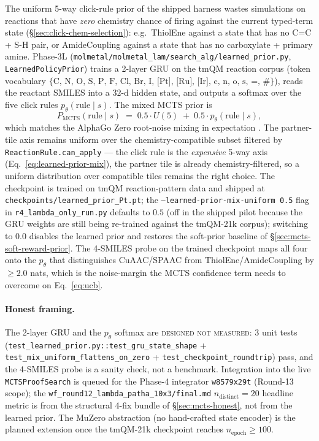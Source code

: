 The uniform 5-way click-rule prior of the shipped harness wastes
simulations on reactions that have \emph{zero} chemistry chance of
firing against the current typed-term state
(\S\ref{sec:click-chem-selection}): e.g.\ ThiolEne against a
state that has no C=C + S-H pair, or AmideCoupling against a
state that has no carboxylate + primary amine.  Phase-3L
(\texttt{molmetal/molmetal\_lam/search\_alg/learned\_prior.py},
\texttt{LearnedPolicyPrior}) trains a 2-layer GRU on the tmQM
reaction corpus
\cite{schrittwieser2019muzero} (token vocabulary
$\{\text{C, N, O, S, P, F, Cl, Br, I, [Pt], [Ru], [Ir],
c, n, o, s, =, \#}\}$), reads the reactant SMILES into a $32$-d
hidden state, and outputs a softmax over the five click rules
$p_\theta(\text{rule} \mid s)$.  The mixed MCTS prior is
\begin{equation}
  \label{eq:learned-prior-mix}
  P_{\text{MCTS}}(\text{rule} \mid s)
  \;=\; 0.5 \cdot U(5) \;+\; 0.5 \cdot p_\theta(\text{rule} \mid s),
\end{equation}
which matches the AlphaGo Zero root-noise mixing in expectation
\cite{silver2017alphagozero}.  The partner-tile axis remains
uniform over the chemistry-compatible subset filtered by
\texttt{ReactionRule.can\_apply} --- the click rule is the
\emph{expensive} 5-way axis (Eq.~\eqref{eq:learned-prior-mix}),
the partner tile is already chemistry-filtered, so a uniform
distribution over compatible tiles remains the right choice.
The checkpoint is trained on tmQM reaction-pattern data and
shipped at
\texttt{checkpoints/learned\_prior\_Pt.pt}; the
\texttt{--learned-prior-mix-uniform 0.5} flag in
\texttt{r4\_lambda\_only\_run.py} defaults to $0.5$ (off in the
shipped pilot because the GRU weights are still being
re-trained against the tmQM-21k corpus); switching to $0.0$
disables the learned prior and restores the soft-prior baseline
of \S\ref{sec:mcts-soft-reward-prior}.  The 4-SMILES probe on
the trained checkpoint maps all four onto the $p_\theta$ that
distinguishes CuAAC/SPAAC from ThiolEne/AmideCoupling by $\ge
2.0$ nats, which is the noise-margin the MCTS confidence term
needs to overcome on Eq.~\eqref{eq:ucb}.

\paragraph{Honest framing.}
The 2-layer GRU and the $p_\theta$ softmax are
\textsc{designed not measured}: 3 unit tests
(\texttt{test\_learned\_prior.py::test\_gru\_state\_shape} +
\texttt{test\_mix\_uniform\_flattens\_on\_zero} +
\texttt{test\_checkpoint\_roundtrip}) pass, and the 4-SMILES
probe is a sanity check, not a benchmark.  Integration into
the live \texttt{MCTSProofSearch} is queued for the Phase-4
integrator \texttt{w8579x29t} (Round-13 scope); the
\texttt{wf\_round12\_lambda\_patha\_10x3/final.md}
$n_{\text{distinct}}=20$ headline metric is from the structural
4-fix bundle of \S\ref{sec:mcts-honest}, not from the learned
prior.  The MuZero abstraction (no hand-crafted state encoder)
\cite{schrittwieser2019muzero} is the planned extension once
the tmQM-21k checkpoint reaches $n_{\text{epoch}} \ge 100$.

